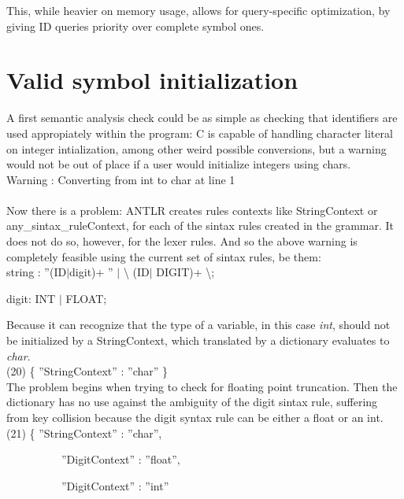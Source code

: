 \documentclass[twocolumn,10ptr]{article}
\begin{document}
	This, while heavier on memory usage, allows for query-specific optimization, by giving ID queries priority over complete symbol ones.
	\section{Valid symbol initialization}
	A first semantic analysis check could be as simple as checking that identifiers are used appropiately within the program: C is capable of handling character literal on integer intialization, among other weird possible conversions, but a warning would not be out of place if a user would initialize integers using chars.\\
	
	Warning : Converting from int to char at line 1\\ \\
	Now there is a problem: ANTLR creates rules contexts like StringContext or any\_sintax\_ruleContext, for each of the sintax rules created in the grammar. It does not do so, however, for the lexer rules. And so the above warning is completely feasible using the current set of sintax rules, be them:\\
	
	string : \textsc{}''\textsc{}(ID\(\mid\)digit)+ \textsc{}''\textsc{} \(\mid\) \textsc{}\textbackslash\textsc{}\textsc{}  (ID\(\mid\) DIGIT)+ \textsc{}\textbackslash\textsc{}\textsc{};
	
	digit: INT \(\mid\) FLOAT;
	
	Because it can recognize that the type of a variable, in this case \textit{ int}, should not be initialized by a StringContext, which translated by a dictionary evaluates to \textit{char}.\\
	
	(20)
	\{  ''StringContext'' : ''char'' \}\\
	
	The problem begins when trying to check for floating point truncation. Then the dictionary has no use against the ambiguity of the digit sintax rule, suffering from key collision because the digit syntax rule can be either a float or an int.\\
	
	(21)
	\{  ''StringContext'' : ''char'',
	
	\ \ \ \ \ \ \ \ \ \   ''DigitContext'' : ''float'',
	
	\ \ \ \ \ \ \ \ \ \   ''DigitContext'' : ''int''
	
\end{document}
